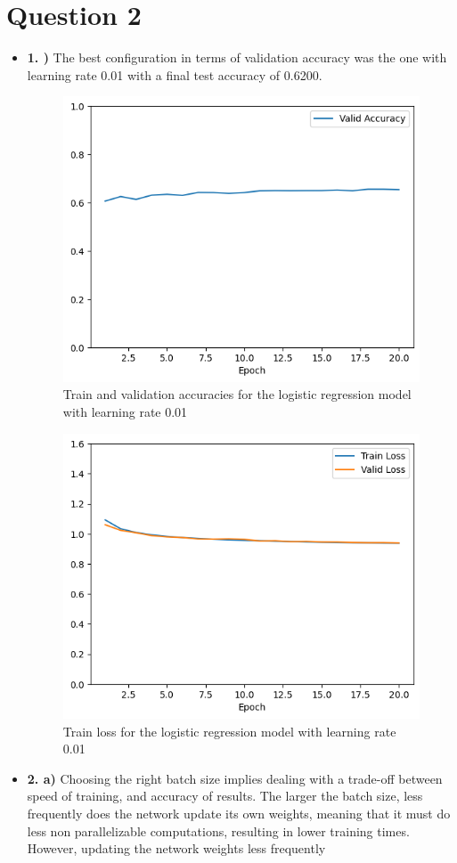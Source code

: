 \documentclass[12pt]{article}
\begin{document}
\section*{Question 2}
\begin{itemize}
    \item \textbf{1. )} The best configuration in terms of validation accuracy was the one with learning rate 0.01 with a final test accuracy of 0.6200.
          \begin{figure}[H]
              \centering
              \includegraphics[width=0.5\linewidth]{../outputs/hw1-q2-1-acc.01.png}
              \caption{Train and validation accuracies for the logistic regression model with learning rate 0.01}
              \label{fig:2.1:acc}
          \end{figure}
          \begin{figure}[H]
              \centering
              \includegraphics[width=0.5\linewidth]{../outputs/hw1-q2-1-loss.01.png}
              \caption{Train loss for the logistic regression model with learning rate 0.01}
              \label{fig:2.1:loss}
          \end{figure}

    \item \textbf{2. a)}
          Choosing the right batch size implies dealing with a trade-off between speed of training, and accuracy of results. The larger the batch size, less frequently does the network update its own weights, meaning that it must do less non parallelizable computations, resulting in lower training times. However, updating the network weights less frequently 
          

\end{itemize}
\end{document}
